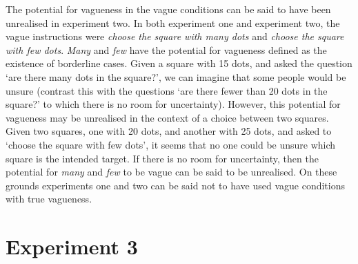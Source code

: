 \documentclass[doc,floatmark]{apa}
\begin{document}

The potential for vagueness in the vague conditions can be said to have been unrealised in experiment two. In both experiment one and experiment two, the vague instructions were  \emph{choose the square with many dots} and \emph{choose the square with few dots}. \emph{Many} and \emph{few} have the potential for vagueness defined as the existence of borderline cases. Given a square with 15 dots, and asked the question `are there many dots in the square?', we can imagine that some people would be unsure (contrast this with the questions `are there fewer than 20 dots in the square?' to which there is no room for uncertainty). However, this potential for vagueness may be unrealised in the context of a choice between two squares. Given two squares, one with 20 dots, and another with 25 dots, and asked to `choose the square with few dots', it seems that no one could be unsure which square is the intended target. If there is no room for uncertainty, then the potential for \emph{many} and \emph{few} to be vague can be said to be unrealised. On these grounds experiments one and two can be said not to have used vague conditions with true vagueness.

\section{Experiment 3}
\end{document}
